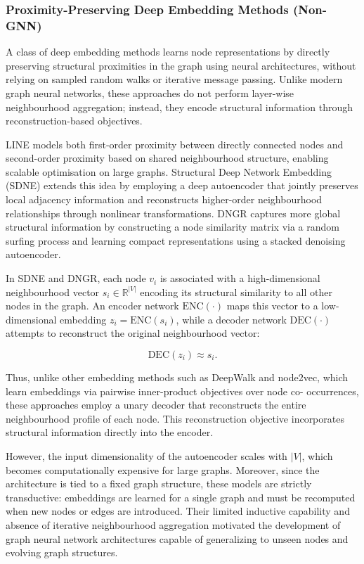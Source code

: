 \subsubsection{Proximity-Preserving Deep Embedding Methods (Non-GNN)}

A class of deep embedding methods learns node representations by directly
preserving structural proximities in the graph using neural architectures,
without relying on sampled random walks or iterative message passing.
Unlike modern graph neural networks, these approaches do not perform
layer-wise neighbourhood aggregation; instead, they encode structural
information through reconstruction-based objectives.

LINE \citep{tang2015line} models both first-order proximity between directly
connected nodes and second-order proximity based on shared neighbourhood
structure, enabling scalable optimisation on large graphs.
Structural Deep Network Embedding (SDNE) \citep{Wang2016StructuralDN}
extends this idea by employing a deep autoencoder that jointly preserves
local adjacency information and reconstructs higher-order neighbourhood
relationships through nonlinear transformations.
DNGR \citep{Cao_Lu_Xu_2016} captures more global structural information by
constructing a node similarity matrix via a random surfing process and
learning compact representations using a stacked denoising autoencoder.

In SDNE and DNGR, each node $v_i$ is associated with a high-dimensional
neighbourhood vector $s_i \in \mathbb{R}^{|V|}$ encoding its structural
similarity to all other nodes in the graph. An encoder network
$\mathrm{ENC}(\cdot)$ maps this vector to a low-dimensional embedding
$z_i = \mathrm{ENC}(s_i)$, while a decoder network
$\mathrm{DEC}(\cdot)$ attempts to reconstruct the original neighbourhood
vector:

\[
\mathrm{DEC}(z_i) \approx s_i.
\]

Thus, unlike other embedding methods such as DeepWalk and node2vec,
which learn embeddings via pairwise inner-product objectives over node
co-
occurrences, these approaches employ a unary decoder that reconstructs
the entire neighbourhood profile of each node. This reconstruction objective
incorporates structural information directly into the encoder.

However, the input dimensionality of the autoencoder scales with $|V|$,
which becomes computationally expensive for large graphs. Moreover,
since the architecture is tied to a fixed graph structure, these models
are strictly transductive: embeddings are learned for a single graph and
must be recomputed when new nodes or edges are introduced. Their limited
inductive capability and absence of iterative neighbourhood aggregation
motivated the development of graph neural network architectures capable
of generalizing to unseen nodes and evolving graph structures.


